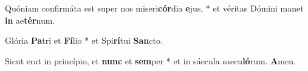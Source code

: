 \vs Quóniam confirmáta est super nos miseri\textbf{cór}dia \textbf{e}jus, * et véritas Dómini manet \textbf{in} ae\textbf{tér}num.

\vs Glória \textbf{Pa}tri et \textbf{Fí}lio * et Spi\textbf{rí}tui \textbf{San}cto.

\vs Sicut erat in princípio, et \textbf{nunc} et \textbf{sem}per * et in sáecula saecu\textbf{ló}rum. \textbf{A}men.

